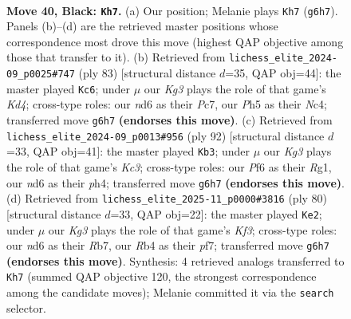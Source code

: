 \documentclass[11pt]{article}
\begin{document}
\clearpage

\begin{figure}[p]\centering
\begin{subfigure}{0.46\textwidth}\centering
\resizebox{\linewidth}{!}{%
\newchessgame
\chessboard[
  setfen={6R1/6p1/3Nppk1/1p5p/1r1P1P1P/4P1P1/6K1/8 b - - 1 40},
  showmover=false,
  pgfstyle=straightmove, color=movearrow, markmove={g6-h7}
]}
\caption{}
\end{subfigure}\hfill
\begin{subfigure}{0.46\textwidth}\centering
\resizebox{\linewidth}{!}{%
\newchessgame
\chessboard[
  setfen={8/2p5/p7/2pkp1R1/P1n4p/2PN1P1P/4r1PK/8 b - - 1 42},
  showmover=false,
  pgfstyle=straightmove, color=movearrow, markmove={d5-c6}
]}
\caption{}
\end{subfigure}
\\[4pt]
\begin{subfigure}{0.46\textwidth}\centering
\resizebox{\linewidth}{!}{%
\newchessgame
\chessboard[
  setfen={4k3/2p3r1/3p2P1/p1p1p3/2P1P2p/2KP3P/8/6R1 w - - 0 47},
  showmover=false,
  pgfstyle=straightmove, color=movearrow, markmove={c3-b3}
]}
\caption{}
\end{subfigure}\hfill
\begin{subfigure}{0.46\textwidth}\centering
\resizebox{\linewidth}{!}{%
\newchessgame
\chessboard[
  setfen={8/1R2pp2/2pk2p1/7p/PP5P/1r3KP1/5P2/8 w - - 1 41},
  showmover=false,
  pgfstyle=straightmove, color=movearrow, markmove={f3-e2}
]}
\caption{}
\end{subfigure}
\caption{\textbf{Move 40, Black: \texttt{Kh7}.} (a) Our position; Melanie plays \texttt{Kh7} (\texttt{g6h7}). Panels (b)--(d) are the retrieved master positions whose correspondence most drove this move (highest QAP objective among those that transfer to it). (b) Retrieved from \texttt{lichess\_elite\_2024-09\_p0025\#747} (ply 83) [structural distance $d$=35, QAP obj=44]: the master played \texttt{Kc6}; under $\mu$ our \emph{Kg3} plays the role of that game's \emph{Kd4}; cross-type roles: our \emph{n}d6 as their \emph{P}c7, our \emph{P}h5 as their \emph{N}c4; transferred move \texttt{g6h7} \textbf{(endorses this move)}. (c) Retrieved from \texttt{lichess\_elite\_2024-09\_p0013\#956} (ply 92) [structural distance $d$=33, QAP obj=41]: the master played \texttt{Kb3}; under $\mu$ our \emph{Kg3} plays the role of that game's \emph{Kc3}; cross-type roles: our \emph{P}f6 as their \emph{R}g1, our \emph{n}d6 as their \emph{p}h4; transferred move \texttt{g6h7} \textbf{(endorses this move)}. (d) Retrieved from \texttt{lichess\_elite\_2025-11\_p0000\#3816} (ply 80) [structural distance $d$=33, QAP obj=22]: the master played \texttt{Ke2}; under $\mu$ our \emph{Kg3} plays the role of that game's \emph{Kf3}; cross-type roles: our \emph{n}d6 as their \emph{R}b7, our \emph{R}b4 as their \emph{p}f7; transferred move \texttt{g6h7} \textbf{(endorses this move)}. Synthesis: 4 retrieved analogs transferred to \texttt{Kh7} (summed QAP objective 120, the strongest correspondence among the candidate moves); Melanie committed it via the \texttt{search} selector.}
\label{fig:thought-m79}
\end{figure}
\end{document}
